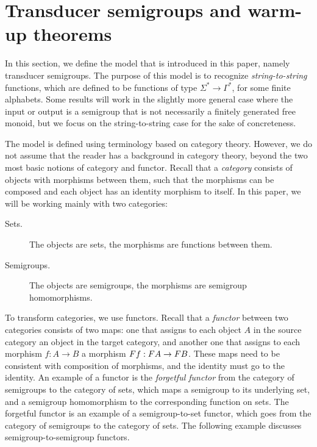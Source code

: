 \section{Transducer semigroups and warm-up theorems}\label{sec:warm-up}

In this section, we define the model that is introduced in this paper, namely transducer semigroups. The purpose of this model is to recognize \emph{string-to-string} functions, which are defined to be functions of type $\Sigma^* \to \Gamma^*$, for some finite alphabets. Some results will work in the slightly more general case where the input or output is a semigroup that is not necessarily a finitely generated free monoid, but we focus on the string-to-string case for the sake of concreteness.

The model is defined using terminology based on category theory. However, we do not assume that the reader has a background in category theory, beyond the two most basic notions of category and functor. Recall that a \emph{category} consists of objects with morphisms between them, such that the morphisms can be composed and each object has an identity morphism to itself. In this paper, we will be working mainly with two categories:
\begin{description}
 \item[Sets.] The objects are sets, the morphisms are functions between them.
 \item[Semigroups.] The objects are semigroups, the morphisms are semigroup homomorphisms.
\end{description}
To transform categories, we use {functors}.
Recall that a \emph{functor} between two categories consists of two maps: one that assigns to each object $A$ in the source category an object in the target category, and another one that assigns to each morphism $f : A \to B$ a morphism $\functor f : \functor A \to \functor B$. These maps need to be consistent with composition of morphisms, and the identity must go to the identity. An example of a functor is the \emph{forgetful functor} from the category of semigroups to the category of sets, which maps a semigroup to its underlying set, and a semigroup homomorphism to the corresponding function on sets. The forgetful functor is an example of a semigroup-to-set functor, which goes from the category of semigroups to the category of sets. The following example discusses semigroup-to-semigroup functors.

